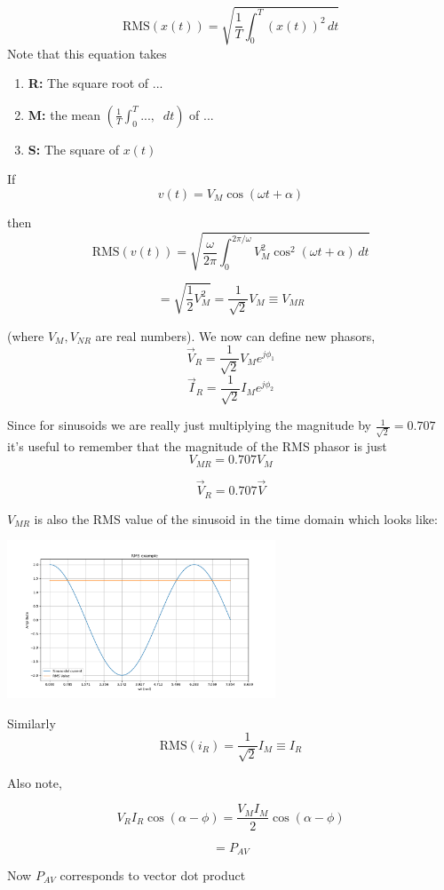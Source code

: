 \[
\text{RMS}(x(t)) = \sqrt{\frac{1}{T} \int_0^T (x(t))^2 \, dt}
\]
Note that this equation takes
\begin{enumerate}
    \item {\bf R: } The square root of ...
    \item {\bf M: }the mean $\left ( \frac{1}{T} \int_0^T ... ,\;\; dt \right )$ of ...
    \item {\bf S: }The square of $x(t)$
\end{enumerate}

If
\[
v(t) = V_M \cos(\omega t + \alpha)
\]

then
\[
\text{RMS}(v(t)) = \sqrt{\frac{\omega}{2\pi} \int_0^{2\pi/\omega} V_M^2 \cos^2(\omega t + \alpha) \, dt}
\]


\[
=\sqrt{ \frac{1}{2} V_M^2 }
= \frac{1}{\sqrt{2}} V_M \equiv V_{MR}
\]

(where $V_M, V_{NR}$ are real numbers).
We now can  define new phasors,
\[
\vec V_R = \frac {1}  {\sqrt{2}}  V_M e^{j\phi_1}
\]
\[
\vec I_R = \frac {1}  {\sqrt{2}}  I_M e^{j\phi_2}
\]

Since for sinusoids we are really just multiplying the magnitude by $\frac {1}  {\sqrt{2}} = 0.707$ it's useful to remember
that  the magnitude of the RMS phasor is just
\[
V_{MR} = 0.707 V_M
\]

\[
\vec V_R = 0.707 \vec V
\]

$V_{MR}$ is also the RMS value of the sinusoid in the time domain
which looks like:

\includegraphics[width=80mm]{figsChapt03/FP56580.png}


Similarly
\[
\text{RMS}(i_R) = \frac{1}{\sqrt{2}} I_M \equiv I_R
\]

\noindent Also note,

\[
V_R I_R \cos(\alpha - \phi) = \frac{V_M I_M}{2} \cos(\alpha - \phi)
\]

\[
= P_{AV}
\]



\noindent Now $P_{AV}$ corresponds to vector dot product

